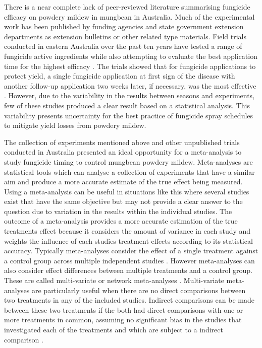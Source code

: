 \documentclass[agronomy,article,submit,moreauthors,pdftex]{mdpi}
\begin{document}
There is a near complete lack of peer-reviewed literature summarising fungicide efficacy on powdery mildew in mungbean in Australia.
Much of the experimental work has been published by funding agencies and state government extension departments as extension bulletins or other related type materials.
Field trials conducted in eastern Australia over the past ten years have tested a range of fungicide active ingredients while also attempting to evaluate the best application time for the highest efficacy \citep{goolhi2013, premer2013, Millmerran2013, Marysmount2013, SueThompson2016, Kelly2017a, Thompson2016}.
The trials showed that for fungicide applications to protect yield, a single fungicide application at first sign of the disease with another follow-up application two weeks later, if necessary, was the most effective \citep{SueThompson2016, Sparks2017}.
However, due to the variability in the results between seasons and experiments, few of these studies produced a clear result based on a statistical analysis.
This variability presents uncertainty for the best practice of fungicide spray schedules to mitigate yield losses from powdery mildew.

The collection of experiments mentioned above and other unpublished trials conducted in Australia presented an ideal opportunity for a meta-analysis to study fungicide timing to control mungbean powdery mildew.
Meta-analyses are statistical tools which can analyse a collection of experiments that have a similar aim and produce a more accurate estimate of the true effect being measured.
Using a meta-analysis can be useful in situations like this where several studies exist that have the same objective but may not provide a clear answer to the question due to variation in the results within the individual studies.
The outcome of a meta-analysis provides a more accurate estimation of the true treatments effect because it considers the amount of variance in each study and weights the influence of each studies treatment effects according to its statistical accuracy.
Typically meta-analyses consider the effect of a single treatment against a control group across multiple independent studies \citep{Madden2011}.
However meta-analyses can also consider effect differences between multiple treatments and a control group.
These are called multi-variate or network meta-analyses \citep{Madden2016}.
Multi-variate meta-analyses are particularly useful when there are no direct comparisons between two treatments in any of the included studies.
Indirect comparisons can be made between these two treatments if the both had direct comparisons with one or more treatments in common, assuming no significant bias in the studies that investigated each of the treatments and which are subject to a indirect comparison \citep{Jansen2011}.
\end{document}
